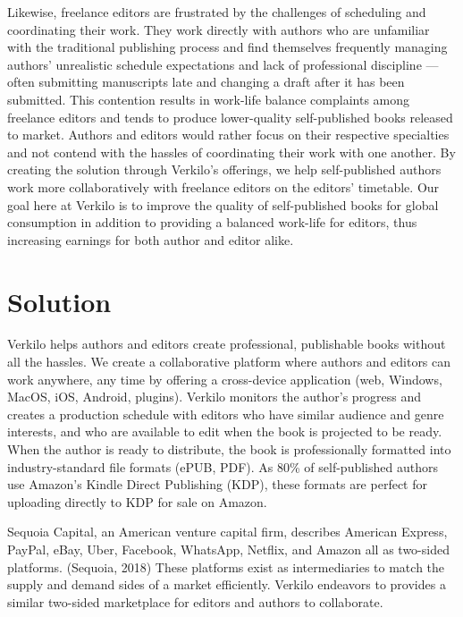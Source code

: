\documentclass[10pt,openany]{book}
\begin{document}
Likewise, freelance editors are frustrated by the challenges of
scheduling and coordinating their work. They work directly with authors
who are unfamiliar with the traditional publishing process and find
themselves frequently managing authors' unrealistic schedule
expectations and lack of professional discipline ---often submitting
manuscripts late and changing a draft after it has been submitted. This
contention results in work-life balance complaints among freelance
editors and tends to produce lower-quality self-published books released
to market. Authors and editors would rather focus on their respective
specialties and not contend with the hassles of coordinating their work
with one another. By creating the solution through Verkilo's offerings,
we help self-published authors work more collaboratively with freelance
editors on the editors' timetable. Our goal here at Verkilo is to
improve the quality of self-published books for global consumption in
addition to providing a balanced work-life for editors, thus increasing
earnings for both author and editor alike.

\hypertarget{solution}{%
\section{Solution}\label{solution}}

Verkilo helps authors and editors create professional, publishable books
without all the hassles. We create a collaborative platform where
authors and editors can work anywhere, any time by offering a
cross-device application (web, Windows, MacOS, iOS, Android, plugins).
Verkilo monitors the author's progress and creates a production schedule
with editors who have similar audience and genre interests, and who are
available to edit when the book is projected to be ready. When the
author is ready to distribute, the book is professionally formatted into
industry-standard file formats (ePUB, PDF). As 80\% of self-published
authors use Amazon's Kindle Direct Publishing (KDP), these formats are
perfect for uploading directly to KDP for sale on Amazon.

Sequoia Capital, an American venture capital firm, describes American
Express, PayPal, eBay, Uber, Facebook, WhatsApp, Netflix, and Amazon all
as two-sided platforms. (Sequoia, 2018) These platforms exist as
intermediaries to match the supply and demand sides of a market
efficiently. Verkilo endeavors to provides a similar two-sided
marketplace for editors and authors to collaborate.
\end{document}
